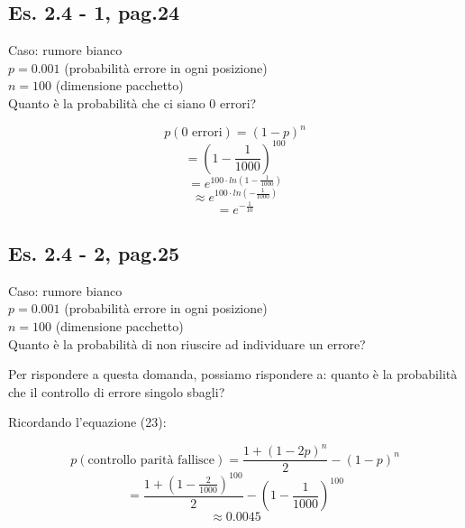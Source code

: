 \newpage 
\subsection*{Es. 2.4 - 1, pag.24}
Caso: rumore bianco\\
$p=0.001$ (probabilità errore in ogni posizione)\\
$n=100$ (dimensione pacchetto)\\

Quanto è la probabilità che ci siano 0 errori?

\begin{equation*}
p(\text{0 errori}) = (1-p)^n
\end{equation*}
\begin{equation*}
= (1-\frac{1}{1000})^{100}
\end{equation*}
\begin{equation*}
= e^{100 \cdot ln(1 - \frac{1}{1000})}
\end{equation*}
\begin{equation*}
\approx e^{100 \cdot ln(-\frac{1}{1000})}
\end{equation*}
\begin{equation*}
= e^{-\frac{1}{10}}
\end{equation*}

\subsection*{Es. 2.4 - 2, pag.25}
Caso: rumore bianco\\
$p=0.001$ (probabilità errore in ogni posizione)\\
$n=100$ (dimensione pacchetto)\\

Quanto è la probabilità di non riuscire ad individuare un errore?

Per rispondere a questa domanda, possiamo rispondere a: quanto è la probabilità che il controllo di errore singolo sbagli?

Ricordando l'equazione (23):

\begin{equation*}
p(\text{controllo parità fallisce}) = \frac{1 + (1-2p)^n}{2}-(1-p)^n
\end{equation*}
\begin{equation*}
= \frac{1 + (1-\frac{2}{1000})^{100}}{2}-(1-\frac{1}{1000})^{100}
\end{equation*}
\begin{equation*}
\approx 0.0045
\end{equation*}

